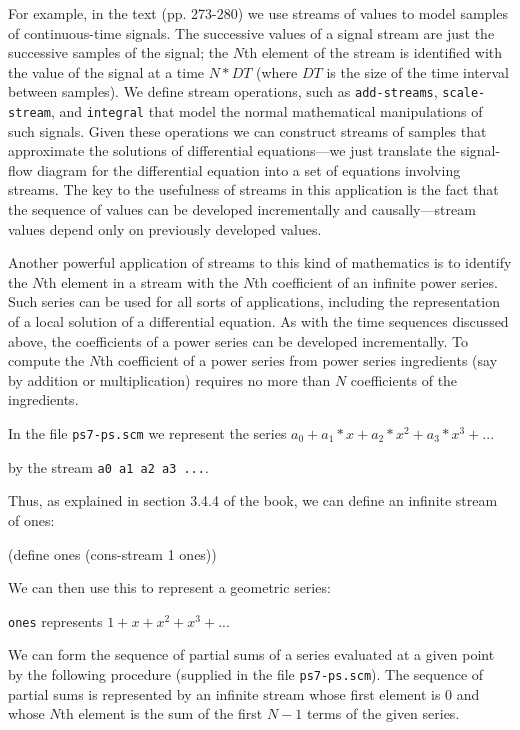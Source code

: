 For example, in the text (pp. 273-280) we use streams of values to model samples of
continuous-time signals.  The successive values of a signal stream are
just the successive samples of the signal; the $N$th element of the
stream is identified with the value of the signal at a time $N*DT$
(where $DT$ is the size of the time interval between samples).  We
define stream operations, such as {\tt add-streams}, {\tt scale-stream}, and
{\tt integral} that model the normal mathematical manipulations of such
signals.  Given these operations we can construct streams of samples
that approximate the solutions of differential equations---we just
translate the signal-flow diagram for the differential equation into a
set of equations involving streams.  The key to the usefulness of
streams in this application is the fact that the sequence of values
can be developed incrementally and causally---stream values depend
only on previously developed values.

Another powerful application of streams to this kind of mathematics is
to identify the $N$th element in a stream with the $N$th coefficient of an
infinite power series.  Such series can be used for all sorts of
applications, including the representation of a local solution of a
differential equation.  As with the time sequences discussed above,
the coefficients of a power series can be developed incrementally.  To
compute the $N$th coefficient of a power series from power series
ingredients (say by addition or multiplication) requires no more than
$N$ coefficients of the ingredients.

In the file {\tt ps7-ps.scm} we represent the series
$a_0 + a_1*x + a_2*x^2 + a_3*x^3 + ..$.

by the stream {\tt a0 a1 a2 a3 ...}.

Thus, as explained in section 3.4.4 of the book, we can define an
infinite stream of ones:

\beginlisp
(define ones (cons-stream 1 ones))
\endlisp

\vpar
We can then use this to represent a geometric series:

{\tt ones} represents $1 + x + x^2 + x^3 + ...$

We can form the sequence of partial sums of a series evaluated at a
given point by the following procedure (supplied in the file {\tt ps7-ps.scm}).
The sequence of partial sums is represented by an infinite stream whose first 
element is 0 and whose $N$th element is the sum of the first $N-1$ terms of the
given series.

